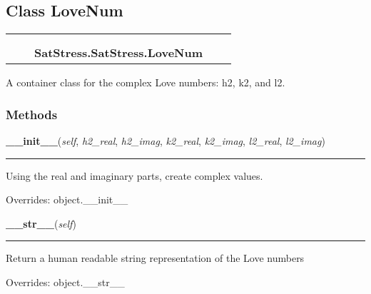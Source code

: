 \subsection{Class LoveNum}

    \label{SatStress:SatStress:LoveNum}
\begin{tabular}{cccccc}
\multicolumn{2}{r}{\settowidth{\BCL}{object}\multirow{2}{\BCL}{object}}
&&
  \\\cline{3-3}
  &&\multicolumn{1}{c|}{}
&&
  \\
&&\multicolumn{2}{l}{\textbf{SatStress.SatStress.LoveNum}}
\end{tabular}

A container class for the complex Love numbers: h2, k2, and l2.



  \subsubsection{Methods}

    \vspace{0.5ex}

\hspace{.8\funcindent}\begin{boxedminipage}{\funcwidth}

    \raggedright \textbf{\_\_init\_\_}(\textit{self}, \textit{h2\_real}, \textit{h2\_imag}, \textit{k2\_real}, \textit{k2\_imag}, \textit{l2\_real}, \textit{l2\_imag})

    \vspace{-1.5ex}

    \rule{\textwidth}{0.5\fboxrule}
\setlength{\parskip}{2ex}
    Using the real and imaginary parts, create complex values.

\setlength{\parskip}{1ex}
      Overrides: object.\_\_init\_\_

    \end{boxedminipage}

    \vspace{0.5ex}

\hspace{.8\funcindent}\begin{boxedminipage}{\funcwidth}

    \raggedright \textbf{\_\_str\_\_}(\textit{self})

    \vspace{-1.5ex}

    \rule{\textwidth}{0.5\fboxrule}
\setlength{\parskip}{2ex}
    Return a human readable string representation of the Love numbers

\setlength{\parskip}{1ex}
      Overrides: object.\_\_str\_\_

    \end{boxedminipage}


